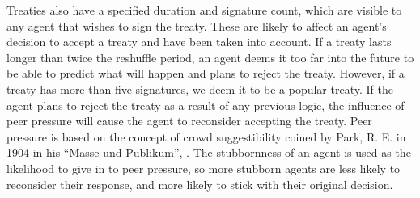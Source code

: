 \begin{table}[htb]
    \centering
\end{table}
Treaties also have a specified duration and signature count, which are visible to any agent that wishes to sign the treaty. These are likely to affect an agent’s decision to accept a treaty and have been taken into account. If a treaty lasts longer than twice the reshuffle period, an agent deems it too far into the future to be able to predict what will happen and plans to reject the treaty. However, if a treaty has more than five signatures, we deem it to be a popular treaty. If the agent plans to reject the treaty as a result of any previous logic, the influence of peer pressure will cause the agent to reconsider accepting the treaty. Peer pressure is based on the concept of crowd suggestibility coined by Park, R. E.  in 1904 in his “Masse und Publikum”, \cite{Solr-413687}. The stubbornness of an agent is used as the likelihood to give in to peer pressure, so more stubborn agents are less likely to reconsider their response, and more likely to stick with their original decision. \par

